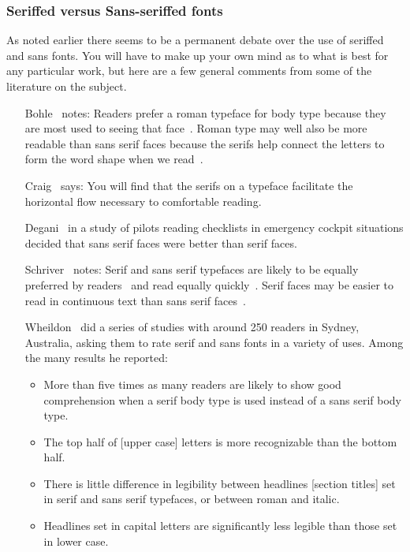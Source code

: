 \documentclass[10pt,letterpaper,extrafontsizes]{memoir}
\begin{document}
\subsubsection{Seriffed versus Sans-seriffed fonts}


    As noted earlier there seems to be a permanent debate over the use
of seriffed and sans fonts. You will have to make up your own mind as
to what is best for any particular work, but here are a few general
comments from some of the literature on the subject.

\begin{itemize}
\def\makelabel#1{\noindent #1}
\item[Bohle~\autocite{BOHLE90}] notes: Readers prefer a roman typeface for body
  type because they are most used to seeing that face~\autocite{REHE72}.
  Roman type may well also be more readable than sans serif faces because
  the serifs help connect the letters to form the word shape when
  we read~\autocite{REHE72}.

\item[Craig~\autocite{CRAIG92}] says: You will find that the serifs on a typeface
  facilitate the horizontal flow necessary to comfortable reading.

\item[Degani~\autocite{DEGANI92}] in a study of pilots reading checklists
  in emergency cockpit situations decided that sans serif faces were
  better than serif faces.

\item[Schriver~\autocite{SCHRIVER97}] notes: Serif and sans serif typefaces 
  are likely to be equally preferred by 
  readers~\autocite{HARTLEY83,TINKER63}
  and read equally quickly~\autocite{GOULD87,HARTLEY83,ZACHRISSOM69}.
  Serif faces may be easier to read in continuous text than sans
  serif faces~\autocite{BURT59,HVISTENDAHL75,ROBINSON71,WHEILDON95}.

\item[Wheildon~\autocite{WHEILDON95}] did a series of studies with around
250 readers in Sydney, Australia, asking them to rate serif and sans fonts
in a variety of uses. Among the many results he reported:
\begin{itemize}
  \item More than five times as many readers are likely to show good
  comprehension when a serif body type is used instead of a sans serif
  body type.
  \item The top half of [upper case] letters is more recognizable than
  the bottom half.
  \item There is little difference in legibility between headlines
  [section titles] set in serif and sans serif typefaces, or between
  roman and italic.
  \item Headlines set in capital letters are significantly less legible
  than those set in lower case.
\end{itemize}

\end{itemize}
\end{document}
